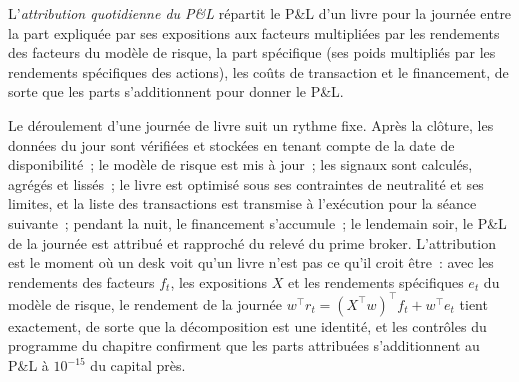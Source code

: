\begin{definition}\label{def:s1:anatomy-of-a-stat-arb-book:attribution}
L'\emph{attribution quotidienne du P\&L} répartit le P\&L d'un livre pour la journée entre la part expliquée par ses expositions aux facteurs multipliées par les rendements des facteurs du modèle de risque, la part spécifique (ses poids multipliés par les rendements spécifiques des actions),
les coûts de transaction et le financement, de sorte que les parts s'additionnent pour donner le P\&L.
\end{definition}

Le déroulement d'une journée de livre suit un rythme fixe. Après la clôture, les données du jour sont vérifiées et stockées en tenant compte de la date de disponibilité~; le modèle de risque est mis à jour~; les signaux sont calculés,
agrégés et lissés~; le livre est optimisé sous ses contraintes de neutralité et ses limites, et la liste des transactions est transmise à l'exécution pour la séance suivante~; pendant la nuit, le financement
s'accumule~; le lendemain soir, le P\&L de la journée est attribué et rapproché du relevé du prime broker. L'attribution est le moment où un desk voit qu'un livre n'est pas
ce qu'il croit être~: avec les rendements des facteurs $f_t$, les expositions $X$ et les rendements spécifiques $e_t$ du modèle de risque, le rendement de la journée $w^\top r_t = (X^\top w)^\top f_t + w^\top e_t$ tient
exactement, de sorte que la décomposition est une identité, et les contrôles du programme du chapitre confirment que les parts attribuées s'additionnent au P\&L à $10^{-15}$ du capital près.

\begin{omfigure}

\label{fig:s1:anatomy-of-a-stat-arb-book:cycle}
\end{omfigure}

